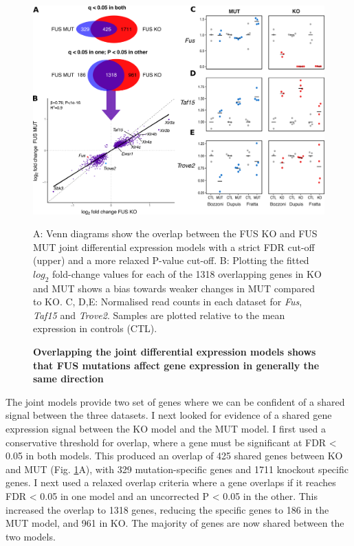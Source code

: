 \begin{figure}[ht!]
	\centering
	\includegraphics[width=\textwidth]{Figures/06_fus_meta/expression_multi.png}
	\caption{\textbf{Overlapping the joint differential expression models shows that FUS mutations affect gene expression in generally the same direction}}
	A: Venn diagrams show the overlap between the FUS KO and FUS MUT joint differential expression models with a strict FDR cut-off (upper) and a more relaxed P-value cut-off. 
	B: Plotting the fitted $log_2$ fold-change values for each of the 1318 overlapping genes in KO and MUT shows a bias towards weaker changes in MUT compared to KO.
	C, D,E: Normalised read counts in each dataset for \textit{Fus}, \textit{Taf15} and \textit{Trove2}. Samples are plotted relative to the mean expression in controls (CTL).
	\label{fig:fus_expression_multipanel}
\end{figure}

The joint models provide two set of genes where we can be confident of a shared signal between the three datasets.  
I next looked for evidence of a shared gene expression signal between the KO model and the MUT model.
I first used a conservative threshold for overlap, where a gene must be significant at FDR < 0.05 in both models. 
This produced an overlap of 425 shared genes between KO and MUT (Fig. \ref{fig:fus_expression_multipanel}A), with 329 mutation-specific genes and 1711 knockout specific genes.
I next used  a relaxed overlap criteria where a gene overlaps if it reaches FDR < 0.05 in one model and an uncorrected P < 0.05 in the other.
This increased the overlap to 1318 genes, reducing the specific genes to 186 in the MUT model, and 961 in KO.
The majority of genes are now shared between the two models.

